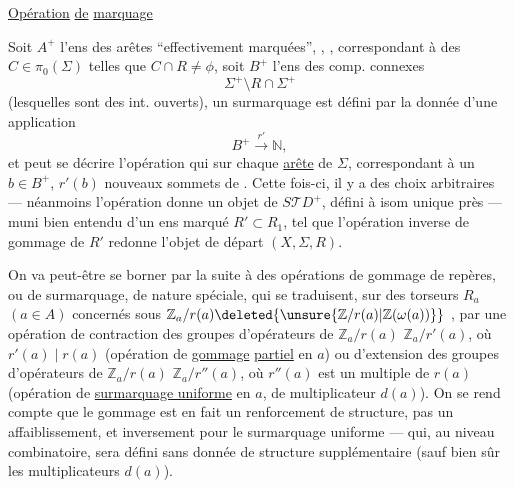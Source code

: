  
\uline{Opération} \uline{de}  \uline{marquage}

Soit $A^+$ l'ens des arêtes  ``effectivement marquées'', ,
,
correspondant à des $C\in\pi_0(\Sigma)$ telles que $C\cap R\ne\phi$, soit $B^+$ l'ens des comp. connexes 
\[
 \Sigma^+\setminus R\cap\Sigma^+
\]
(lesquelles sont des int. ouverts), un surmarquage est défini par la donnée d'une application
\[
 B^+\xrightarrow{r'}\mathbb N,
\]
et peut se décrire   l'opération qui sur chaque
\uline{arête} 
de $\Sigma$, correspondant à un $b\in B^+$, $r'(b)$ nouveaux sommets de  .
Cette fois-ci,  il y a des choix arbitraires --- néanmoins l'opération donne un objet de $S\mathcal TD^+$, défini à isom unique près  --- muni bien entendu d'un ens marqué $R'\subset R_1$, tel que l'opération inverse de gommage de $R'$ redonne l'objet de départ $(X,\Sigma,R)$.


On va peut-être se borner par la suite à des opérations de gommage de repères, ou de surmarquage, de nature spéciale, qui se traduisent, sur  des torseurs $R_a$ $(a\in A)$ concernés sous
$\mathbb Z_a/r(a)\deleted{\unsure{\mathbb Z/r(a)|\mathbb Z(\omega(a))}}$
,
par une opération de contraction des groupes d'opérateurs de $\mathbb Z_a/r(a)$  $\mathbb Z_a/r'(a)$, où $r'(a)\mid r(a)$
(opération de \uline{gommage} \uline{partiel}  en $a$)
ou d'extension des groupes d'opérateurs de $\mathbb Z_a/r(a)$  $\mathbb Z_a/r''(a)$, où $r''(a)$  est un multiple de $r(a)$
(opération de \uline{surmarquage uniforme} en $a$, \deleted{)} de multiplicateur $d(a)$).
On se rend compte  que le gommage  est en fait un renforcement de structure, pas un affaiblissement, et inversement pour le surmarquage uniforme --- qui, au niveau combinatoire, sera défini sans donnée de structure supplémentaire (sauf bien sûr les multiplicateurs $d(a)$).

